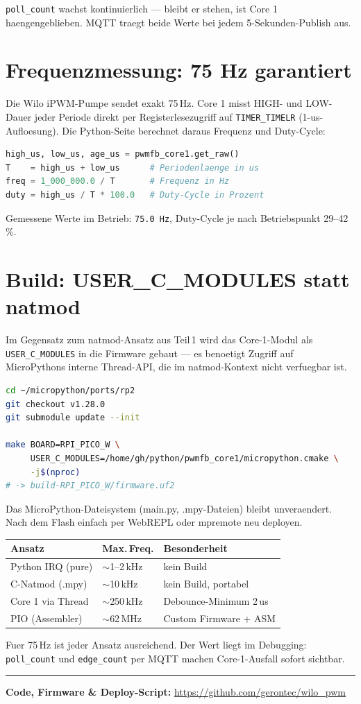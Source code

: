 \documentclass[11pt,a4paper]{article}
\begin{document}
\texttt{poll\_count} wachst kontinuierlich --- bleibt er stehen,
ist Core 1 haengengeblieben.
MQTT traegt beide Werte bei jedem 5-Sekunden-Publish aus.

\section{Frequenzmessung: 75 Hz garantiert}

Die Wilo iPWM-Pumpe sendet exakt 75\,Hz.
Core 1 misst HIGH- und LOW-Dauer jeder Periode direkt per
Registerlesezugriff auf \texttt{TIMER\_TIMELR} (1-us-Aufloesung).
Die Python-Seite berechnet daraus Frequenz und Duty-Cycle:

\begin{lstlisting}[language=Python, caption={Frequenzberechnung im Python-Wrapper}]
high_us, low_us, age_us = pwmfb_core1.get_raw()
T    = high_us + low_us      # Periodenlaenge in us
freq = 1_000_000.0 / T       # Frequenz in Hz
duty = high_us / T * 100.0   # Duty-Cycle in Prozent
\end{lstlisting}

Gemessene Werte im Betrieb:
\texttt{75.0\,Hz}, Duty-Cycle je nach Betriebspunkt 29--42\,\%.

\section{Build: USER\_C\_MODULES statt natmod}

Im Gegensatz zum natmod-Ansatz aus Teil\,1 wird das Core-1-Modul
als \texttt{USER\_C\_MODULES} in die Firmware gebaut ---
es benoetigt Zugriff auf MicroPythons interne Thread-API,
die im natmod-Kontext nicht verfuegbar ist.

\begin{lstlisting}[language=bash, caption={Firmware bauen}]
cd ~/micropython/ports/rp2
git checkout v1.28.0
git submodule update --init

make BOARD=RPI_PICO_W \
     USER_C_MODULES=/home/gh/python/pwmfb_core1/micropython.cmake \
     -j$(nproc)
# -> build-RPI_PICO_W/firmware.uf2
\end{lstlisting}

Das MicroPython-Dateisystem (main.py, .mpy-Dateien) bleibt
unveraendert. Nach dem Flash einfach per WebREPL oder mpremote
neu deployen.

\begin{center}
\begin{tabular}{lll}
\toprule
\textbf{Ansatz} & \textbf{Max.\,Freq.} & \textbf{Besonderheit} \\
\midrule
Python IRQ (pure)   & $\sim$1--2\,kHz  & kein Build \\
C-Natmod (.mpy)     & $\sim$10\,kHz    & kein Build, portabel \\
Core 1 via Thread   & $\sim$250\,kHz   & Debounce-Minimum 2\,us \\
PIO (Assembler)     & $\sim$62\,MHz    & Custom Firmware + ASM \\
\bottomrule
\end{tabular}
\end{center}

Fuer 75\,Hz ist jeder Ansatz ausreichend.
Der Wert liegt im Debugging: \texttt{poll\_count} und
\texttt{edge\_count} per MQTT machen Core-1-Ausfall sofort sichtbar.

\bigskip
\noindent\rule{\textwidth}{0.4pt}
\textbf{Code, Firmware \& Deploy-Script:}
\url{https://github.com/gerontec/wilo_pwm}
\end{document}
